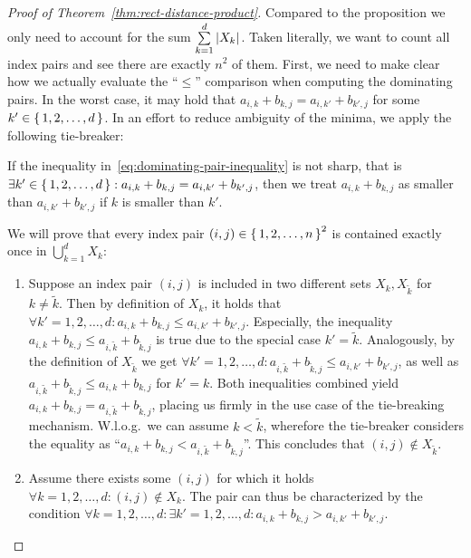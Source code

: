 \begin{proof}[Proof of Theorem~\ref{thm:rect-distance-product}]
    Compared to the proposition we only need to account for the sum $\sum\limits_{k = 1}^d \left\lvert X_k\right\rvert_{}$.
    Taken literally, we want to count all index pairs and see there are exactly $n^2$ of them.
    First, we need to make clear how we actually evaluate the ``$\leq$'' comparison when computing the dominating pairs.
    In the worst case, it may hold that $a_{i, k} + b_{k, j} = a_{i, k'} + b_{k', j}$ for some $k' \in \left\{\,1, 2, \dots, d\,\right\}$.
    In an effort to reduce ambiguity of the minima, we apply the following tie-breaker:
    \begin{displayquote}
        If the inequality in~\ref{eq:dominating-pair-inequality} is not sharp, that is $\exists k' \in \left\{\,1, 2, \dots, d\,\right\}: a_{i, k} + b_{k, j} = a_{i, k'} + b_{k', j}$, then we treat $a_{i, k} + b_{k, j}$ as smaller than $a_{i, k'} + b_{k', j}$ if $k$ is smaller than $k'$.
    \end{displayquote}
    We will prove that every index pair $(i, j) \in \left\{\,1, 2, \dots, n\,\right\}^2$ is contained exactly once in $\bigcup\limits_{k = 1}^d X_k$:
    \begin{enumerate}
        \item %
            Suppose an index pair $(i, j)$ is included in two different sets $X_k, X_{\tilde{k}}$ for $k \neq \tilde{k}$.
            Then by definition of $X_k$, it holds that $\forall k' = 1, 2, \dots, d: a_{i, k} + b_{k, j} \leq a_{i, k'} + b_{k', j}$.
            Especially, the inequality $a_{i, k} + b_{k, j} \leq a_{i, \tilde{k}} + b_{\tilde{k}, j}$ is true due to the special case $k' = \tilde{k}$.
            Analogously, by the definition of $X_{\tilde{k}}$ we get $\forall k' = 1, 2, \dots, d: a_{i, \tilde{k}} + b_{\tilde{k}, j} \leq a_{i, k'} + b_{k', j}$, as well as $a_{i, \tilde{k}} + b_{\tilde{k}, j} \leq a_{i, k} + b_{k, j}$ for $k' = k$.
            Both inequalities combined yield $a_{i, k} + b_{k, j} = a_{i, \tilde{k}} + b_{\tilde{k}, j}$, placing us firmly in the use case of the tie-breaking mechanism.
            W.l.o.g.\ we can assume $k < \tilde{k}$, wherefore the tie-breaker considers the equality as ``$a_{i, k} + b_{k, j} < a_{i, \tilde{k}} + b_{\tilde{k}, j}$''.
            This concludes that $(i, j) \not\in X_{\tilde{k}}$. \Lightning{}
        \item %
            Assume there exists some $(i, j)$ for which it holds $\forall k = 1, 2, \dots, d: (i, j) \not\in X_k$.
            The pair can thus be characterized by the condition $\forall k = 1, 2, \dots, d: \exists k' = 1, 2, \dots, d: a_{i, k} + b_{k, j} > a_{i, k'} + b_{k', j}$.

\end{enumerate}
\end{proof}
